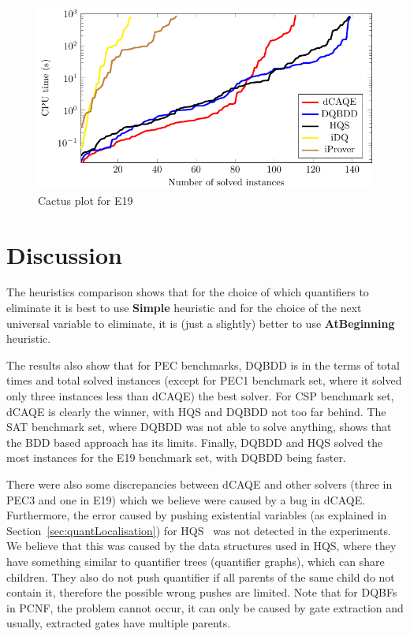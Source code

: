 \documentclass[
  digital, %
  color,
  twoside, %
  table,   %
  nolof,     %
  nolot,     %
]{fithesis3}
\theoremstyle{definition}
\theoremstyle{remark}
\newcommand{\QEsimple}{\textbf{Simple}}
\newcommand{\QUatbeginning}{\textbf{At\-Be\-gin\-ning}}
\begin{document}
\begin{figure}
  \centering
    \centering
    \includegraphics[width=\textwidth]{figures/E19logcactusplot.pdf}
  \caption{Cactus plot for E19}
  \label{fig:cactusE19}
\end{figure}

\section{Discussion}
The heuristics comparison shows that for the choice of which quantifiers to eliminate it is best to use \QEsimple{} heuristic and for the choice of the next universal variable to eliminate, it is (just a slightly) better to use \QUatbeginning{} heuristic. 

The results also show that for PEC benchmarks, DQBDD is in the terms of total times and total solved instances (except for PEC1 benchmark set, where it solved only three instances less than dCAQE) the best solver. For CSP benchmark set, dCAQE is clearly the winner, with HQS and DQBDD not too far behind. The SAT benchmark set, where DQBDD was not able to solve anything, shows that the BDD based approach has its limits. Finally, DQBDD and HQS solved the most instances for the E19 benchmark set, with DQBDD being faster.

There were also some discrepancies between dCAQE and other solvers (three in PEC3 and one in E19) which we believe were caused by a bug in dCAQE. Furthermore, the error caused by pushing existential variables (as explained in Section~\ref{sec:quantLocalisation}) for HQS~\cite{HQSquantifierLocalisation} was not detected in the experiments. We believe that this was caused by the data structures used in HQS, where they have something similar to quantifier trees (quantifier graphs), which can share children. They also do not push quantifier if all parents of the same child do not contain it, therefore the possible wrong pushes are limited. Note that for DQBFs in PCNF, the problem cannot occur, it can only be caused by gate extraction and usually, extracted gates have multiple parents.
\end{document}
